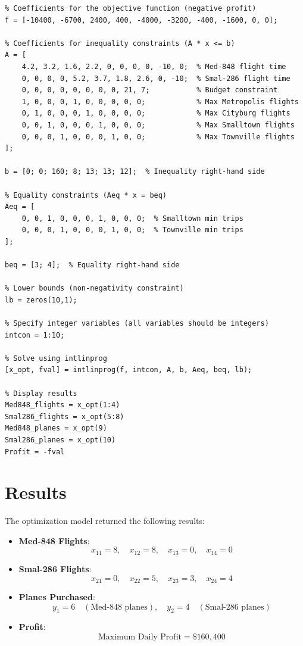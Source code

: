 \documentclass{article}
\begin{document}
\begin{verbatim}
% Coefficients for the objective function (negative profit)
f = [-10400, -6700, 2400, 400, -4000, -3200, -400, -1600, 0, 0];

% Coefficients for inequality constraints (A * x <= b)
A = [
    4.2, 3.2, 1.6, 2.2, 0, 0, 0, 0, -10, 0;  % Med-848 flight time
    0, 0, 0, 0, 5.2, 3.7, 1.8, 2.6, 0, -10;  % Smal-286 flight time
    0, 0, 0, 0, 0, 0, 0, 0, 21, 7;           % Budget constraint
    1, 0, 0, 0, 1, 0, 0, 0, 0, 0;            % Max Metropolis flights
    0, 1, 0, 0, 0, 1, 0, 0, 0, 0;            % Max Cityburg flights
    0, 0, 1, 0, 0, 0, 1, 0, 0, 0;            % Max Smalltown flights
    0, 0, 0, 1, 0, 0, 0, 1, 0, 0;            % Max Townville flights
];

b = [0; 0; 160; 8; 13; 13; 12];  % Inequality right-hand side

% Equality constraints (Aeq * x = beq)
Aeq = [
    0, 0, 1, 0, 0, 0, 1, 0, 0, 0;  % Smalltown min trips
    0, 0, 0, 1, 0, 0, 0, 1, 0, 0;  % Townville min trips
];

beq = [3; 4];  % Equality right-hand side

% Lower bounds (non-negativity constraint)
lb = zeros(10,1);

% Specify integer variables (all variables should be integers)
intcon = 1:10;

% Solve using intlinprog
[x_opt, fval] = intlinprog(f, intcon, A, b, Aeq, beq, lb);

% Display results
Med848_flights = x_opt(1:4)
Smal286_flights = x_opt(5:8)
Med848_planes = x_opt(9)
Smal286_planes = x_opt(10)
Profit = -fval
\end{verbatim}

\section*{Results}
The optimization model returned the following results:
\begin{itemize}
    \item \textbf{Med-848 Flights}:
    \[
    x_{11} = 8, \quad x_{12} = 8, \quad x_{13} = 0, \quad x_{14} = 0
    \]
    \item \textbf{Smal-286 Flights}:
    \[
    x_{21} = 0, \quad x_{22} = 5, \quad x_{23} = 3, \quad x_{24} = 4
    \]
    \item \textbf{Planes Purchased}:
    \[
    y_1 = 6 \quad (\text{Med-848 planes}), \quad y_2 = 4 \quad (\text{Smal-286 planes})
    \]
    \item \textbf{Profit}:
    \[
    \text{Maximum Daily Profit} = \$160,400
    \]
\end{itemize}
\end{document}
